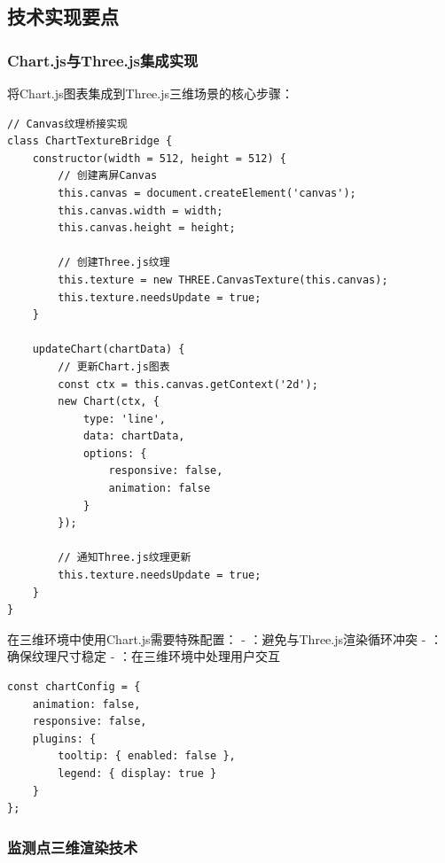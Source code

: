 \hypertarget{ux6280ux672fux5b9eux73b0ux8981ux70b9}{%
\subsection{技术实现要点}\label{ux6280ux672fux5b9eux73b0ux8981ux70b9}}

\hypertarget{chart.jsux4e0ethree.jsux96c6ux6210ux5b9eux73b0}{%
\subsubsection{Chart.js与Three.js集成实现}\label{chart.jsux4e0ethree.jsux96c6ux6210ux5b9eux73b0}}


将Chart.js图表集成到Three.js三维场景的核心步骤：

\begin{lstlisting}[style=javascript]
// Canvas纹理桥接实现
class ChartTextureBridge {
    constructor(width = 512, height = 512) {
        // 创建离屏Canvas
        this.canvas = document.createElement('canvas');
        this.canvas.width = width;
        this.canvas.height = height;
        
        // 创建Three.js纹理
        this.texture = new THREE.CanvasTexture(this.canvas);
        this.texture.needsUpdate = true;
    }
    
    updateChart(chartData) {
        // 更新Chart.js图表
        const ctx = this.canvas.getContext('2d');
        new Chart(ctx, {
            type: 'line',
            data: chartData,
            options: {
                responsive: false,
                animation: false
            }
        });
        
        // 通知Three.js纹理更新
        this.texture.needsUpdate = true;
    }
}
\end{lstlisting}


在三维环境中使用Chart.js需要特殊配置： - ：避免与Three.js渲染循环冲突 - ：确保纹理尺寸稳定 - ：在三维环境中处理用户交互

\begin{lstlisting}[style=javascript]
const chartConfig = {
    animation: false,
    responsive: false,
    plugins: {
        tooltip: { enabled: false },
        legend: { display: true }
    }
};
\end{lstlisting}

\hypertarget{ux76d1ux6d4bux70b9ux4e09ux7ef4ux6e32ux67d3ux6280ux672f}{%
\subsubsection{监测点三维渲染技术}\label{ux76d1ux6d4bux70b9ux4e09ux7ef4ux6e32ux67d3ux6280ux672f}}

